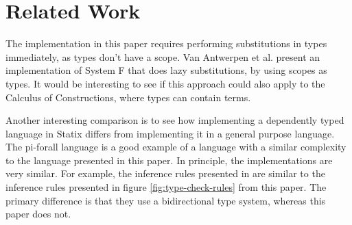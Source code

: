 \chapter{Related Work}
The implementation in this paper requires performing substitutions in types immediately, as types don't have a scope. Van Antwerpen et al. \cite[sect 2.5]{scopes_as_types} present an implementation of System F that does lazy substitutions, by using scopes as types. It would be interesting to see if this approach could also apply to the Calculus of Constructions, where types can contain terms. 

Another interesting comparison is to see how implementing a dependently typed language in Statix differs from implementing it in a general purpose language. The pi-forall language\cite{pi_forall} is a good example of a language with a similar complexity to the language presented in this paper. In principle, the implementations are very similar. For example, the inference rules presented in \cite{pi_forall} are similar to the inference rules presented in figure \ref{fig:type-check-rules} from this paper. The primary difference is that they use a bidirectional type system, whereas this paper does not.


